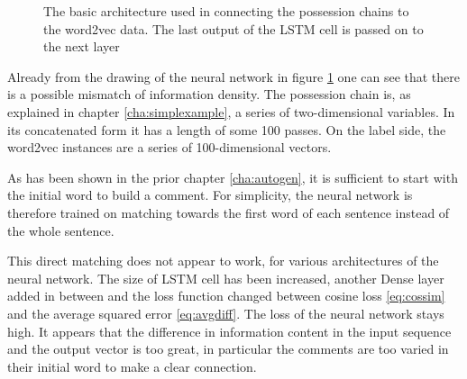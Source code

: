 \documentclass[10pt, a4paper]{UUThesisTemplate}
\begin{document}
\begin{figure}
\caption{The basic architecture used in connecting the possession chains to the word2vec data. The last output of the LSTM cell is passed on to the next layer}\label{fig:connectionnn}
\end{figure}

Already from the drawing of the neural network in figure \ref{fig:connectionnn} one can see that there is a possible mismatch of information density. The possession chain is, as explained in chapter \ref{cha:simplexample}, a series of two-dimensional variables. In its concatenated form it has a length of some 100 passes. On the label side, the word2vec instances are a series of 100-dimensional vectors.

As has been shown in the prior chapter \ref{cha:autogen}, it is sufficient to start with the initial word to build a comment. For simplicity, the neural network is therefore trained on matching towards the first word of each sentence instead of the whole sentence.

This direct matching does not appear to work, for various architectures of the neural network. The size of LSTM cell has been increased, another Dense layer added in between and the loss function changed between cosine loss \eqref{eq:cossim} and the  average squared error \eqref{eq:avgdiff}. The loss of the neural network stays high. It appears that the difference in information content in the input sequence and the output vector is too great, in particular the comments are too varied in their initial word to make a clear connection.
\end{document}
